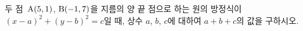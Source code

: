 두 점~$\mathrm{A}(5{,}\mkern3mu\mathopen{}1)$, $\mathrm{B}(-1{,}\mkern3mu\mathopen{}7)$을 지름의 양 끝 점으로 하는 원의 방정식이 $(x-a)^2+(y-b)^2=c$일 때, 상수 $a$, $b$, $c$에 대하여 $a+b+c$의 값을 구하시오.
